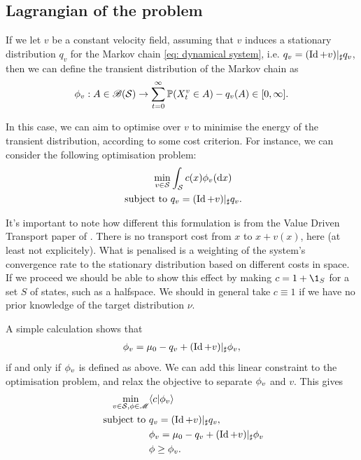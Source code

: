 \documentclass[twoside,10pt]{../jmlr}
\begin{document}
\subsection{Lagrangian of the problem}

If we let $v$ be a constant velocity field, assuming that $v$ induces a stationary distribution $q_v$ for the Markov chain \eqref{eq: dynamical system}, i.e. $q_v=(\operatorname{Id}+v)\vert_\sharp q_v$, then we can define the transient distribution of the Markov chain as
\begin{align}
    \phi_v:A\in\mathscr{B}(\mathcal{S})\to \sum_{t=0}^\infty \mathbb{P}(X_t^v\in A)-q_v(A)\in[0,\infty].
\end{align}

In this case, we can aim to optimise over $v$ to minimise the energy of the transient distribution, according to some cost criterion. For instance, we can consider the following optimisation problem:
\begin{align}
    \min_{v\in\mathcal{S}}& \int_{\mathcal{S}} c(x)\phi_v(\mathrm{d} x)\\ \mbox{ subject to }& q_v=(\operatorname{Id}+v)\vert_\sharp q_v. \label{eq: control problem of minimal bias}
\end{align}


\begin{remark}
    It's important to note how different this formulation is from the Value Driven Transport paper of \cite{PDRLOT}. There is no transport cost from $x$ to $x+v(x)$, here (at least not explicitely). What is penalised is a weighting of the system's convergence rate to the stationary distribution based on different costs in space. If we proceed we should be able to show this effect by making $c=1+\1_{S}$ for a set $S$ of states, such as a halfspace. We should in general take $c\equiv 1$ if we have no prior knowledge of the target distribution $\nu$. 
\end{remark}


A simple calculation shows that 
\begin{align}
    \phi_v=\mu_0-q_v+ (\operatorname{Id}+ v)\vert_\sharp \phi_v, \label{eq: transient distribution constraint}
\end{align}
if and only if $\phi_v$ is defined as above. We can add this linear constraint to the optimisation problem, and relax the objective to separate $\phi_v$ and $v$. This gives
\begin{align}
    \min_{v\in\mathcal{S},\phi\in\mathscr{M}}& \langle c\vert\phi_v\rangle\\ \mbox{ subject to }& q_v=(\operatorname{Id}+v)\vert_\sharp q_v,\\ & \phi_v=\mu_0-q_v+ (\operatorname{Id}+ v)\vert_\sharp \phi_v \\& \phi\ge \phi_v.
\end{align}
\end{document}
